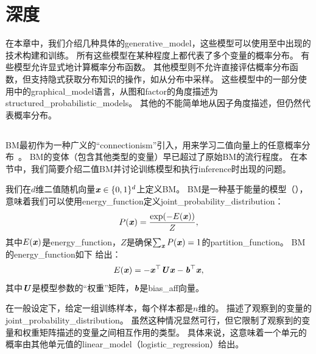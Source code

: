 \chapter{深度}
\label{chap:deep_generative_models}
在本章中，我们介绍几种具体的\gls{generative_model}，这些模型可以使用至中出现的技术构建和训练。
所有这些模型在某种程度上都代表了多个变量的概率分布。
有些模型允许显式地计算概率分布函数。
其他模型则不允许直接评估概率分布函数，但支持隐式获取分布知识的操作，如从分布中采样。
这些模型中的一部分使用中的\gls{graphical_model}语言，从图和\gls{factor}的角度描述为\gls{structured_probabilistic_models}。
其他的不能简单地从因子角度描述，但仍然代表概率分布。


\section{}
\label{sec:boltzmann_machines}
\gls{BM}最初作为一种广义的``\gls{connectionism}''引入，用来学习二值向量上的任意概率分布~\citep{Fahlman83,Ackley85,Hinton-Boltzmann,Hinton86a}。
\gls{BM}的变体（包含其他类型的变量）早已超过了原始\gls{BM}的流行程度。
在本节中，我们简要介绍二值\gls{BM}并讨论训练模型和执行\gls{inference}时出现的问题。

我们在$d$维二值随机向量$\boldsymbol{\mathit{x}} \in \{0, 1\}^d$上定义\gls{BM}。
\gls{BM}是一种基于能量的模型（），意味着我们可以使用\gls{energy_function}定义\gls{joint_probability_distribution}：
\begin{align}\label{eq:201px}
 P(\boldsymbol{\mathit{x}}) = \frac{\exp(-E(\boldsymbol{\mathit{x}}))}{Z},
\end{align}
其中$E(\boldsymbol{\mathit{x}})$是\gls{energy_function}，$Z$是确保$\sum_{\boldsymbol{\mathit{x}}} P(\boldsymbol{\mathit{x}})=1$的\gls{partition_function}。
\gls{BM}的\gls{energy_function}如下
给出：
\begin{align}\label{eq:202E}
 E(\boldsymbol{\mathit{x}}) = -\boldsymbol{\mathit{x}}^\top \boldsymbol{\mathit{U}} \boldsymbol{\mathit{x}} - \boldsymbol{\mathit{b}}^\top \boldsymbol{\mathit{x}},
\end{align}
其中$\boldsymbol{\mathit{U}}$是模型参数的``权重''矩阵，$\boldsymbol{\mathit{b}}$是\gls{bias_aff}向量。


在一般设定下，给定一组训练样本，每个样本都是$n$维的。
描述了观察到的变量的\gls{joint_probability_distribution}。
虽然这种情况显然可行，但它限制了观察到的变量和权重矩阵描述的变量之间相互作用的类型。
具体来说，这意味着一个单元的概率由其他单元值的\gls{linear_model}（\gls{logistic_regression}）给出。

